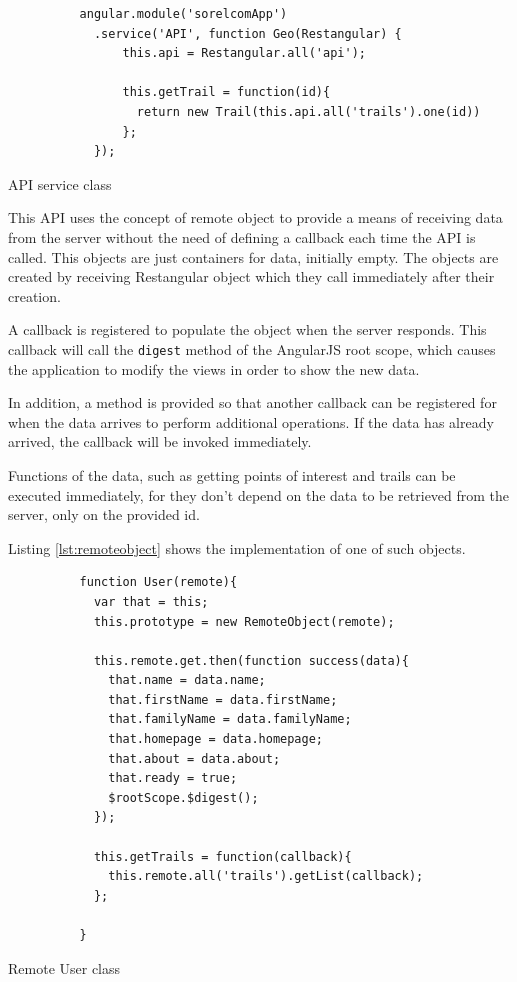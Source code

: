 \begin{listing}[ht]\centering
  \begin{minipage}{.85\textwidth}
    \begin{verbatim}
          angular.module('sorelcomApp')
            .service('API', function Geo(Restangular) {
            	this.api = Restangular.all('api');
            	
            	this.getTrail = function(id){
            	  return new Trail(this.api.all('trails').one(id))
            	};
            });
    \end{verbatim}
  \end{minipage}
  \caption{API service class}\label{lst:api}
\end{listing}

This API uses the concept of remote object to provide a means of receiving data from the server without the need of defining a callback each time the API is called. This objects are just containers for data, initially empty. The objects are created by receiving Restangular object which they call immediately after their creation.

A callback is registered to populate the object when the server responds. This callback will call the \texttt{digest} method of the AngularJS root scope, which causes the application to modify the views in order to show the new data.

In addition, a method is provided so that another callback can be registered for when the data arrives to perform additional operations. If the data has already arrived, the callback will be invoked immediately.

Functions of the data, such as getting points of interest and trails can be executed immediately, for they don't depend on the data to be retrieved from the server, only on the provided id.

Listing \ref{lst:remoteobject} shows the implementation of one of such objects.

\begin{listing}[ht]\centering
  \begin{minipage}{.85\textwidth}
    \begin{verbatim}
          function User(remote){
            var that = this;
            this.prototype = new RemoteObject(remote);
            
            this.remote.get.then(function success(data){
              that.name = data.name;
              that.firstName = data.firstName;
              that.familyName = data.familyName;
              that.homepage = data.homepage;
              that.about = data.about;
              that.ready = true;
              $rootScope.$digest();
            });
            
            this.getTrails = function(callback){
              this.remote.all('trails').getList(callback);
            };
            
          }
    \end{verbatim}
  \end{minipage}
  \caption{Remote User class}\label{lst:remoteobject}
\end{listing}

